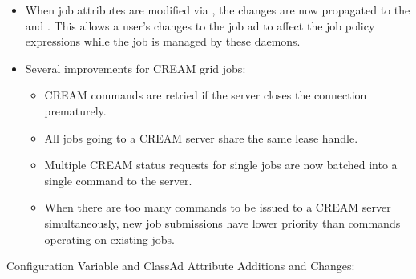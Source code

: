 \begin{itemize}
\item When job attributes are modified via , the changes
are now propagated to the  and . This
allows a user's changes to the job ad to affect the job policy expressions
while the job is managed by these daemons.

\item Several improvements for CREAM grid jobs:
  \begin{itemize}
  \item CREAM commands are retried if the server closes the connection
    prematurely.
  \item All jobs going to a CREAM server share the same lease handle.
  \item Multiple CREAM status requests for single jobs are now batched
    into a single command to the server.
  \item When there are too many commands to be issued to a CREAM server
    simultaneously, new job submissions have lower priority than commands
    operating on existing jobs.
  \end{itemize}

\end{itemize}

\noindent Configuration Variable and ClassAd Attribute Additions and Changes:

